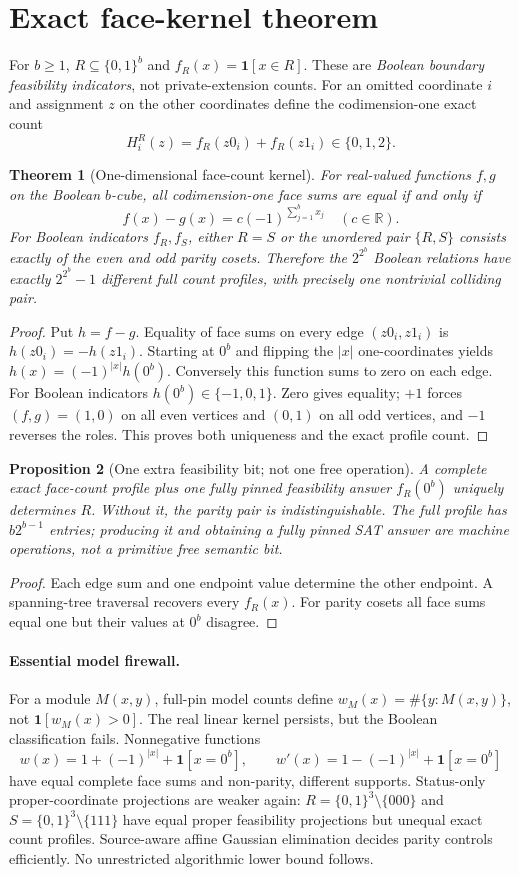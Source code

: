 \documentclass[11pt]{article}
\newtheorem{theorem}{Theorem}
\newtheorem{proposition}[theorem]{Proposition}
\begin{document}
\section{Exact face-kernel theorem}
For $b\ge1$, $R\subseteq\{0,1\}^b$ and $f_R(x)=\mathbf1[x\in R]$. These are \emph{Boolean boundary feasibility indicators}, not private-extension counts. For an omitted coordinate $i$ and assignment $z$ on the other coordinates define the codimension-one exact count
\[
H_i^R(z)=f_R(z0_i)+f_R(z1_i)\in\{0,1,2\}.
\]
\begin{theorem}[One-dimensional face-count kernel]
For real-valued functions $f,g$ on the Boolean $b$-cube, all codimension-one face sums are equal if and only if
\[
f(x)-g(x)=c(-1)^{\sum_{j=1}^b x_j}\quad(c\in\mathbb R).
\]
For Boolean indicators $f_R,f_S$, either $R=S$ or the unordered pair $\{R,S\}$ consists exactly of the even and odd parity cosets. Therefore the $2^{2^b}$ Boolean relations have exactly $2^{2^b}-1$ different full count profiles, with precisely one nontrivial colliding pair.
\end{theorem}
\begin{proof}
Put $h=f-g$. Equality of face sums on every edge $(z0_i,z1_i)$ is $h(z0_i)=-h(z1_i)$. Starting at $0^b$ and flipping the $|x|$ one-coordinates yields $h(x)=(-1)^{|x|}h(0^b)$. Conversely this function sums to zero on each edge. For Boolean indicators $h(0^b)\in\{-1,0,1\}$. Zero gives equality; $+1$ forces $(f,g)=(1,0)$ on all even vertices and $(0,1)$ on all odd vertices, and $-1$ reverses the roles. This proves both uniqueness and the exact profile count.
\end{proof}
\begin{proposition}[One extra feasibility bit; not one free operation]
A complete exact face-count profile plus one fully pinned feasibility answer $f_R(0^b)$ uniquely determines $R$. Without it, the parity pair is indistinguishable. The full profile has $b2^{b-1}$ entries; producing it and obtaining a fully pinned SAT answer are machine operations, not a primitive free semantic bit.
\end{proposition}
\begin{proof}
Each edge sum and one endpoint value determine the other endpoint. A spanning-tree traversal recovers every $f_R(x)$. For parity cosets all face sums equal one but their values at $0^b$ disagree.
\end{proof}
\paragraph{Essential model firewall.}
For a module $M(x,y)$, full-pin model counts define $w_M(x)=\#\{y:M(x,y)\}$, not $\mathbf1[w_M(x)>0]$. The real linear kernel persists, but the Boolean classification fails. Nonnegative functions
\[
w(x)=1+(-1)^{|x|}+\mathbf1[x=0^b],\qquad
w'(x)=1-(-1)^{|x|}+\mathbf1[x=0^b]
\]
have equal complete face sums and non-parity, different supports. Status-only proper-coordinate projections are weaker again: $R=\{0,1\}^3\setminus\{000\}$ and $S=\{0,1\}^3\setminus\{111\}$ have equal proper feasibility projections but unequal exact count profiles. Source-aware affine Gaussian elimination decides parity controls efficiently. No unrestricted algorithmic lower bound follows.
\end{document}
